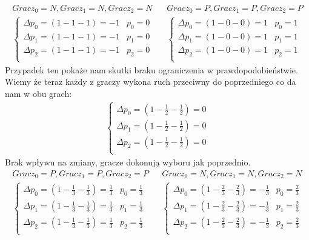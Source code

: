 \begin{align*}
Gracz_0 = N, Gracz_1 = N, Gracz_2 = N && Gracz_0 = P, Gracz_1 = P, Gracz_2 = P \\
\left\{
\begin{array}{ll}
\Delta p_0 = (1 - 1 - 1) =  -1 & p_0=0\\
\Delta p_1 = (1 - 1 - 1) =  -1 & p_1= 0\\
\Delta p_2 = (1 - 1 - 1) =  -1 & p_2=0\\
\end{array} 
\right. &&
\left\{
\begin{array}{ll}
\Delta p_0 = (1 - 0 - 0) =  1 & p_0= 1\\
\Delta p_1 = (1 - 0 - 0) =  1 & p_1= 1\\
\Delta p_2 = (1 - 0 - 0) =  1 & p_2= 1\\
\end{array}
\right.
\end{align*}
Przypadek ten pokaże nam skutki braku ograniczenia w prawdopodobieństwie. Wiemy że teraz każdy z graczy wykona ruch przeciwny do poprzedniego co da nam w obu grach:
\begin{align*}
\left\{
\begin{array}{l}
\Delta p_0 = (1 - \frac{1}{2} - \frac{1}{2}) =  0 \\
\Delta p_1 = (1 - \frac{1}{2} - \frac{1}{2}) =  0 \\
\Delta p_2 = (1 - \frac{1}{2} - \frac{1}{2}) =  0 \\
\end{array} 
\right.
\end{align*}
Brak wpływu na zmiany, gracze dokonują wyboru jak poprzednio.
\begin{align*}
Gracz_0 = P, Gracz_1 = P, Gracz_2 = P && Gracz_0 = N, Gracz_1 = N, Gracz_2 = N \\
\left\{
\begin{array}{ll}
\Delta p_0 = (1 - \frac{1}{3} - \frac{1}{3}) =  \frac{1}{3} & p_0= \frac{1}{3}\\
\Delta p_1 = (1 - \frac{1}{3} - \frac{1}{3}) =  \frac{1}{3} & p_1= \frac{1}{3}\\
\Delta p_2 = (1 - \frac{1}{3} - \frac{1}{3}) =  \frac{1}{3} & p_2= \frac{1}{3}\\
\end{array} 
\right. &&
\left\{
\begin{array}{ll}
\Delta p_0 = (1 - \frac{2}{3} - \frac{2}{3}) =  -\frac{1}{3} & p_0= \frac{2}{3}\\
\Delta p_1 = (1 - \frac{2}{3} - \frac{2}{3}) =  -\frac{1}{3} & p_1= \frac{2}{3}\\
\Delta p_2 = (1 - \frac{2}{3} - \frac{2}{3}) =  -\frac{1}{3} & p_2= \frac{2}{3}\\
\end{array}
\right.
\end{align*}
